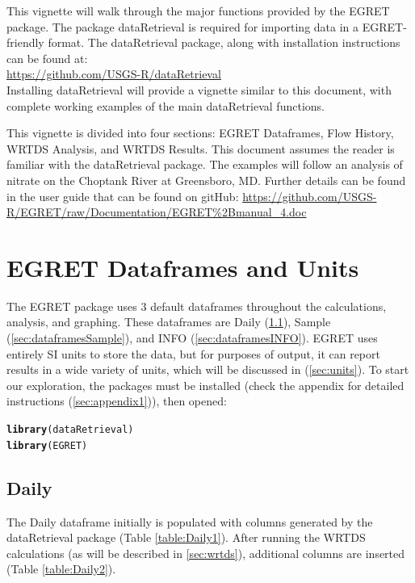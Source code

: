 \documentclass[a4paper,11pt]{article}\usepackage{graphicx, color}
\makeatletter
\newcommand{\hlfunctioncall}[1]{\textcolor[rgb]{0.501960784313725,0,0.329411764705882}{\textbf{#1}}}%
\newenvironment{kframe}{%
 \def\at@end@of@kframe{}%
 \ifinner\ifhmode%
  \def\at@end@of@kframe{\end{minipage}}%
  \begin{minipage}{\columnwidth}%
 \fi\fi%
 \def\FrameCommand##1{\hskip\@totalleftmargin \hskip-\fboxsep
 \colorbox{shadecolor}{##1}\hskip-\fboxsep
     \hskip-\linewidth \hskip-\@totalleftmargin \hskip\columnwidth}%
 \MakeFramed {\advance\hsize-\width
   \@totalleftmargin\z@ \linewidth\hsize
   \@setminipage}}%
 {\par\unskip\endMakeFramed%
 \at@end@of@kframe}
\newenvironment{knitrout}{}{} %
\makeatother
\begin{document}
This vignette will walk through the major functions provided by the EGRET package. The package dataRetrieval is required for importing data in a EGRET-friendly format. The dataRetrieval package, along with installation instructions can be found at:
\\
\url{https://github.com/USGS-R/dataRetrieval}
\\
Installing dataRetrieval will provide a vignette similar to this document, with complete working examples of the main dataRetrieval functions.

This vignette is divided into four sections: EGRET Dataframes, Flow History, WRTDS Analysis, and WRTDS Results. This document assumes the reader is familiar with the dataRetrieval package. The examples will follow an analysis of nitrate on the Choptank River at Greensboro, MD. Further details can be found in the user guide that can be found on gitHub: \url{https://github.com/USGS-R/EGRET/raw/Documentation/EGRET%2Bmanual_4.doc}



\section{EGRET Dataframes and Units}
\label{sec:dataframes}
The EGRET package uses 3 default dataframes throughout the calculations, analysis, and graphing. These dataframes are Daily (\ref{sec:dataframesDaily}), Sample (\ref{sec:dataframesSample}), and INFO (\ref{sec:dataframesINFO}). EGRET uses entirely SI units to store the data, but for purposes of output, it can report results in a wide variety of units, which will be discussed in (\ref{sec:units}). To start our exploration, the packages must be installed (check the appendix for detailed instructions (\ref{sec:appendix1})), then opened:

\begin{knitrout}
\color{fgcolor}\begin{kframe}
\begin{alltt}
\hlfunctioncall{library}(dataRetrieval)
\hlfunctioncall{library}(EGRET)
\end{alltt}
\end{kframe}
\end{knitrout}


\subsection{Daily}
\label{sec:dataframesDaily}
The Daily dataframe initially is populated with columns generated by the dataRetrieval package (Table \ref{table:Daily1}).  After running the WRTDS calculations (as will be described in \ref{sec:wrtds}), additional columns are inserted (Table \ref{table:Daily2}).
\end{document}
